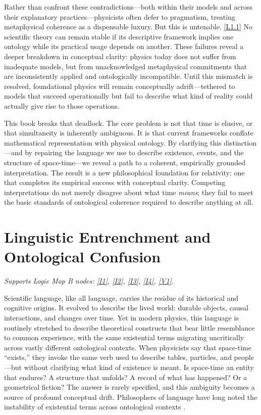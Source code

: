 \documentclass[12pt]{book}
\newcounter{logicanchor}
\newenvironment{logicanchorenv}[1]{\refstepcounter{logicanchor}\label{#1}}{}
\newcommand{\logiclink}[2]{\begin{logicanchorenv}{logic:#1}\end{logicanchorenv}\hyperref[appendix:#1]{[#1]}\xspace}
\begin{document}
Rather than confront these contradictions---both within their models and across their explanatory practices---physicists often defer to pragmatism, treating metaphysical coherence as a dispensable luxury. But this is untenable. \logiclink{L1.1}{} No scientific theory can remain stable if its descriptive framework implies one ontology while its practical usage depends on another. These failures reveal a deeper breakdown in conceptual clarity: physics today does not suffer from inadequate models, but from unacknowledged metaphysical commitments that are inconsistently applied and ontologically incompatible. Until this mismatch is resolved, foundational physics will remain conceptually adrift---tethered to models that succeed operationally but fail to describe what kind of reality could actually give rise to those operations.

This book breaks that deadlock. The core problem is not that time is elusive, or that simultaneity is inherently ambiguous. It is that current frameworks conflate mathematical representation with physical ontology. By clarifying this distinction---and by repairing the language we use to describe existence, events, and the structure of space-time---we reveal a path to a coherent, empirically grounded interpretation. The result is a new philosophical foundation for relativity: one that completes its empirical success with conceptual clarity. Competing interpretations do not merely disagree about what time \textit{means}; they fail to meet the basic standards of ontological coherence required to describe anything at all.

\section{Linguistic Entrenchment and Ontological Confusion}\label{sec:1.2}
\noindent\textit{Supports Logic Map B nodes: \hyperref[appendix:I1]{[I1]}, \hyperref[appendix:I2]{[I2]}, \hyperref[appendix:I3]{[I3]}, \hyperref[appendix:I4]{[I4]}, \hyperref[appendix:V1]{[V1]}.}

\vspace{4pt}

Scientific language, like all language, carries the residue of its historical and cognitive origins. It evolved to describe the lived world: durable objects, causal interactions, and changes over time. Yet in modern physics, this language is routinely stretched to describe theoretical constructs that bear little resemblance to common experience, with the same existential terms migrating uncritically across vastly different ontological contexts. When physicists say that space-time ``exists,'' they invoke the same verb used to describe tables, particles, and people---but without clarifying what kind of existence is meant. Is space-time an entity that endures? A structure that unfolds? A record of what has happened? Or a geometrical fiction? The answer is rarely specified, and this ambiguity becomes a source of profound conceptual drift. Philosophers of language have long noted the instability of existential terms across ontological contexts \citep{Carnap1950, Ludlow2001}.
\end{document}
